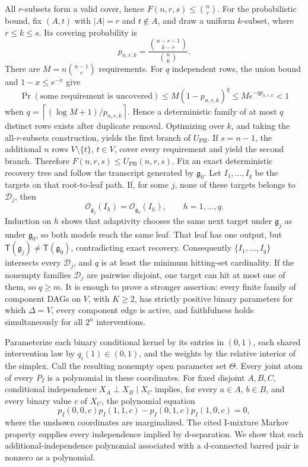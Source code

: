 All \(r\)-subsets form a valid cover, hence \(F(n,r,s)\le\binom nr\). For the probabilistic bound, fix \((A,t)\) with \(|A|=r\) and \(t\notin A\), and draw a uniform \(k\)-subset, where \(r\le k\le s\). Its covering probability is
\[
 p_{n,r,k}=\frac{\binom{n-r-1}{k-r}}{\binom nk}.
\]
There are \(M=n\binom{n-1}{r}\) requirements. For \(q\) independent rows, the union bound and \(1-x\le e^{-x}\) give
\[
 \Pr(\text{some requirement is uncovered})
 \le M(1-p_{n,r,k})^q
 \le M e^{-q p_{n,r,k}}<1
\]
when \(q=\left\lceil(\log M+1)/p_{n,r,k}\right\rceil\). Hence a deterministic family of at most \(q\) distinct rows exists after duplicate removal. Optimizing over \(k\), and taking the all-\(r\)-subsets construction, yields the first branch of \(U_{\mathrm{PB}}\). If \(s=n-1\), the additional \(n\) rows \(V\setminus\{t\}\), \(t\in V\), cover every requirement and yield the second branch. Therefore \(F(n,r,s)\le U_{\mathrm{PB}}(n,r,s)\).
Fix an exact deterministic recovery tree and follow the transcript generated by \(\mathfrak g_0\). Let \(I_1,\ldots,I_q\) be the targets on that root-to-leaf path. If, for some \(j\), none of these targets belongs to \(\mathscr D_j\), then
\[
 \mathcal O_{\mathfrak g_j}(I_h)=\mathcal O_{\mathfrak g_0}(I_h),
 \qquad h=1,\ldots,q.
\]
Induction on \(h\) shows that adaptivity chooses the same next target under \(\mathfrak g_j\) as under \(\mathfrak g_0\), so both models reach the same leaf. That leaf has one output, but \(\mathsf T(\mathfrak g_j)\ne\mathsf T(\mathfrak g_0)\), contradicting exact recovery. Consequently \(\{I_1,\ldots,I_q\}\) intersects every \(\mathscr D_j\), and \(q\) is at least the minimum hitting-set cardinality. If the nonempty families \(\mathscr D_j\) are pairwise disjoint, one target can hit at most one of them, so \(q\ge m\).
It is enough to prove a stronger assertion: every finite family of component DAGs on \(V\), with \(K\ge2\), has strictly positive binary parameters for which \(\Delta=V\), every component edge is active, and faithfulness holds simultaneously for all \(2^n\) interventions.

Parameterize each binary conditional kernel by its entries in \((0,1)\), each shared intervention law by \(q_i(1)\in(0,1)\), and the weights by the relative interior of the simplex. Call the resulting nonempty open parameter set \(\Theta\). Every joint atom of every \(P_I\) is a polynomial in these coordinates. For fixed disjoint \(A,B,C\), conditional independence \(X_A\perp X_B\mid X_C\) implies, for every \(a\in A\), \(b\in B\), and every binary value \(c\) of \(X_C\), the polynomial equation
\[
 p_I(0,0,c)p_I(1,1,c)-p_I(0,1,c)p_I(1,0,c)=0,
\]
where the unshown coordinates are marginalized. The cited I-mixture Markov property supplies every independence implied by d-separation. We show that each additional-independence polynomial associated with a d-connected barred pair is nonzero as a polynomial.

